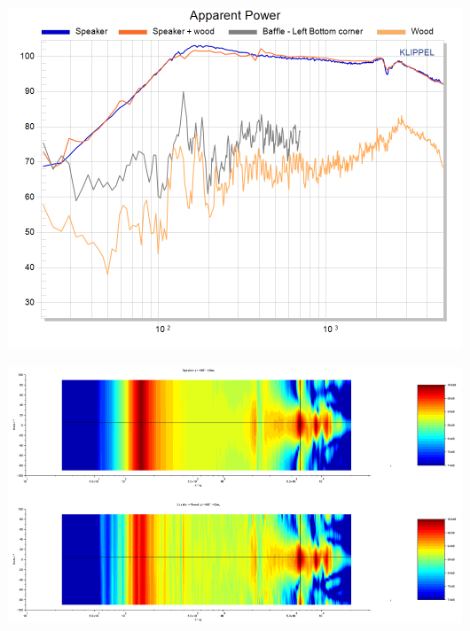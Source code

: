 \documentclass{report}
\begin{document}
\begin{minipage}{0.5\textwidth} %
\begin{center}
	\includegraphics[width=0.9\textwidth]{GridOpti/Vib_Pow} 
\end{center}
\end{minipage}
\begin{minipage}{0.5\textwidth}
\begin{center}
	\includegraphics[width=0.9\textwidth]{GridOpti/compa_baffle_Vib} 
\end{center}
\end{minipage}

\begin{minipage}{0.5\textwidth}	%
\begin{center}
    \captionsetup{hypcap=false} 
	\label{fig:vib_pow}
\end{center}
\end{minipage}
\begin{minipage}{0.5\textwidth}
\begin{center}
    \captionsetup{hypcap=false} 
	\label{fig:vib_comp}
\end{center}
\end{minipage}\\
\end{document}
